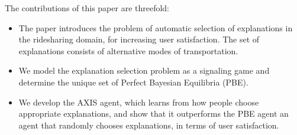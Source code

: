 \documentclass[letterpaper]{article} %
\begin{document}
The contributions of this paper are threefold:
\begin{itemize}
    \item The paper introduces the problem of automatic selection of explanations in the ridesharing domain, for increasing user satisfaction. The set of explanations consists of alternative modes of transportation.
    \item We model the explanation selection problem as a signaling game and determine the unique set of Perfect Bayesian Equilibria (PBE).
    \item We develop the AXIS agent, which learns from how people choose appropriate explanations, and show that it outperforms the PBE agent an agent that randomly chooses explanations, in terms of user satisfaction. 
\end{itemize}
\end{document}

